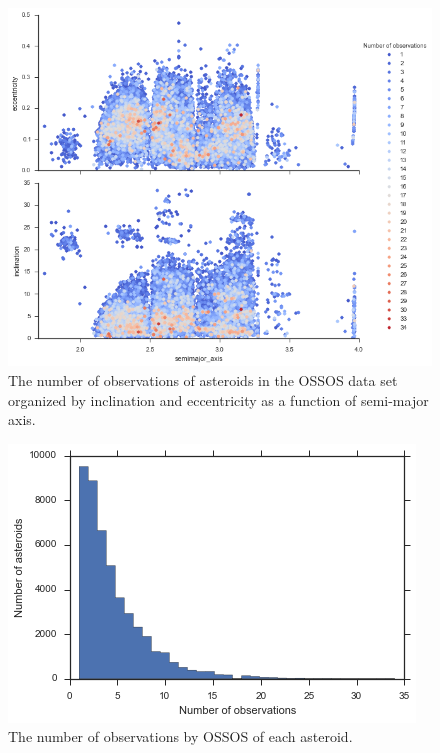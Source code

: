 \documentclass[iop,apj]{emulateapj}
\begin{document}
\begin{figure}[!htb]
    \centering
    \includegraphics[width=\linewidth]{graphs/occurance2.png}
    \caption{The number of observations of asteroids in the OSSOS data set organized by inclination and eccentricity as a function of semi-major axis.}\label{fig:4}
\end{figure}

\begin{figure}[!htb]
    \centering
    \includegraphics[width=\linewidth]{graphs/hist_obs.png}
    \caption{The number of observations by OSSOS of each asteroid.}\label{fig:5}
\end{figure}
\end{document}

